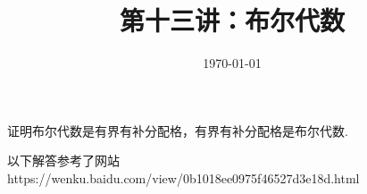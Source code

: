 \documentclass[11pt, a4paper, UTF8]{ctexart}
\title{第十三讲：布尔代数}
\date{\today}     %
\begin{document}
\maketitle
\noplagiarism	%
\beginthishw	%

\begin{problem}	%
  证明布尔代数是有界有补分配格，有界有补分配格是布尔代数.
\end{problem}

\begin{remark}	%
  以下解答参考了网站https://wenku.baidu.com/view/0b1018ee0975f46527d3e18d.html
\end{remark}
\end{document}
